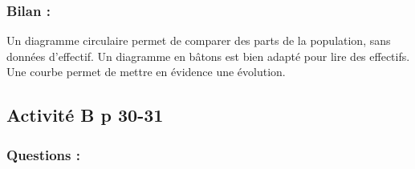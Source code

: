 \documentclass[12pt,a4paper]{book}
\begin{document}
\subsubsection*{Bilan :}

Un diagramme circulaire permet de comparer des parts de la population, sans données d'effectif. Un diagramme en bâtons est bien adapté pour lire des effectifs. Une courbe permet de mettre en évidence une évolution.

\subsection*{Activité B p 30-31}

\subsubsection*{Questions :}
\end{document}
